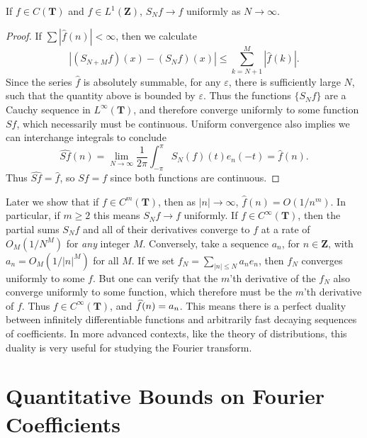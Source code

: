 \begin{corollary}
    If $f \in C(\mathbf{T})$ and $\widehat{f} \in L^1(\mathbf{Z})$, $S_N f \to f$ uniformly as $N \to \infty$.
\end{corollary}
\begin{proof}
    If $\sum |\widehat{f}(n)| < \infty$, then we calculate
    \[ |(S_{N + M} f)(x) - (S_N f)(x)| \leq \sum_{k = N+1}^M |\widehat{f}(k)|. \]
    Since the series $\widehat{f}$ is absolutely summable, for any $\varepsilon$, there is sufficiently large $N$, such that the quantity above is bounded by $\varepsilon$. Thus the functions $\{ S_N f \}$ are a Cauchy sequence in $L^\infty(\mathbf{T})$, and therefore converge uniformly to some function $Sf$, which necessarily must be continuous. Uniform convergence also implies we can interchange integrals to conclude
    \[ \widehat{Sf}(n) = \lim_{N \to \infty} \frac{1}{2\pi} \int_{-\pi}^\pi S_N(f)(t) e_n(-t) = \widehat{f}(n). \]
    Thus $\widehat{Sf} = \widehat{f}$, so $Sf = f$ since both functions are continuous.
\end{proof}

Later we show that if $f \in C^m(\mathbf{T})$, then as $|n| \to \infty$, $\widehat{f}(n) = O(1/n^m)$. In particular, if $m \geq 2$ this means $S_N f \to f$ uniformly. If $f \in C^\infty(\mathbf{T})$, then the partial sums $S_N f$ and all of their derivatives converge to $f$ at a rate of $O_M(1/N^M)$ for {\it any} integer $M$. Conversely, take a sequence $a_n$, for $n \in \mathbf{Z}$, with $a_n = O_M(1/|n|^M)$ for all $M$. If we set $f_N = \sum_{|n| \leq N} a_n e_n$, then $f_N$ converges uniformly to some $f$. But one can verify that the $m$'th derivative of the $f_N$ also converge uniformly to some function, which therefore must be the $m$'th derivative of $f$. Thus $f \in C^\infty(\mathbf{T})$, and $\smash{\widehat{f}(n)} = a_n$. This means there is a perfect duality between infinitely differentiable functions and arbitrarily fast decaying sequences of coefficients. In more advanced contexts, like the theory of distributions, this duality is very useful for studying the Fourier transform.

\section{Quantitative Bounds on Fourier Coefficients}

